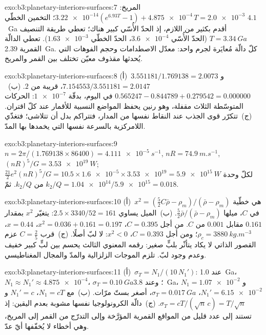 \begin{solution}{exo:b3:planetary-interiors-surfaces:7}
المريخ: $\num{3.22e-14}(e^{6.93T} - 1) + \num{4.875e-4}\,T = \num{2.0e-3}$؛
التخمين الخطّي $4.1$~Ga أقدم بكثير من اللازم، إذ الحدّ الأُسّي كبير
هناك؛ تعطي طريقة التنصيف $T = \qty{3.34}{Ga}$ (الحدّ الأُسّي
$\num{3.6e-4}$، الحدّ الخطّي $\num{1.63e-3}$). تعطي الدالّة القمرية
\qty{2.39}{Ga}. كلّ دالّة مُعايَرة لجرم واحد: معدّل
الاصطدامات وحجم الفوهات التي يُحدثها مقذوف معيّن تختلف
بين القمر والمريخ.
\end{solution}

\begin{solution}{exo:b3:planetary-interiors-surfaces:8}
(أ)~$3.551181/1.769138 = 2.0073$ و$7.154553/3.551181 = 2.0147$، قريبة من
$2$. (ب)~$0.565247 - 0.844789 + 0.279542 = 0.000000$ في اليوم، بدقّة
$\num{1e-7}$: الحركات المتوسّطة الثلاث مقفلة، وهو رنين يحفظ
المواضع النسبية للأقمار عند كلّ اقتران. (ج)~تتكرّر قوى الجذب عند
النقاط نفسها من المدار، فتتراكم بدل أن تتلاشى؛
فتغذّي اللامركزية بالسرعة نفسها التي يخمدها بها المدّ.
\end{solution}

\begin{solution}{exo:b3:planetary-interiors-surfaces:9}
$n = 2\pi/(1.769138\times86400) = \qty{4.111e-5}{s^{-1}}$, $nR =
\qty{74.9}{m.s^{-1}}$, $(nR)^5/G = \qty{3.53e19}{W}$;
$\tfrac{21}{2}e^2(nR)^5/G = 10.5\times\num{1.6e-5}\times\num{3.53e19} =
\qty{5.9e15}{W}$ لكلّ وحدة من $k_2/Q$. ثمّ $k_2/Q =
\num{1.04e14}/\num{5.9e15} = 0.018$.
\end{solution}

\begin{solution}{exo:b3:planetary-interiors-surfaces:10}
(أ)~$x^2 = (\tfrac52C\bar\rho - \rho_m)/(\bar\rho - \rho_m)$ هي خطّية في
$C$، ميلها $\tfrac52\bar\rho/(\bar\rho - \rho_m)$. (ب)~الميل يساوي
$2.5\times3340/52 = 161$: يتغيّر $x^2$ بمقدار $0.161$ مقابل $0.001$ من $C$.
من أجل $C = 0.395$، $x^2 = 0.036 + 0.161 = 0.197$، $x = 0.44$، $\rho_c =
\qty{3880}{kg.m^{-3}}$؛ ومن أجل $C = 0.393$، $x^2 < 0$: لا لبّ أصلًا.
(ج)~قرب $C = \tfrac25$ عزم القصور الذاتي لا يكاد يتأثّر بلبٍّ صغير:
رقمه المعنوي الثالث يحسم بين لبٍّ كبير خفيف وعدم وجود لبّ.
تلزم الموجات الزلزالية والمدّ والمجال المغناطيسي.
\end{solution}

\begin{solution}{exo:b3:planetary-interiors-surfaces:11}
(أ)~$\sigma_T = N_1/(10\,N_1')$: عند \qty{1.0}{Ga}، $N_1 \approx N_1' \approx
\num{4.875e-4}$، $\sigma_T = \qty{0.10}{Ga}$؛ وعند \qty{3.8}{Ga}، $N_1 =
\num{1.07e-2}$ و$N_1' = \num{6.15e-2}$، $\sigma_T = \qty{0.017}{Ga}$،
أصغر بستّ مرّات. (ب)~مع $N_1 = cT$، $N_1' = c$ و$\sigma_T =
cT/(\sqrt n\,c) = T/\sqrt n$. (ج)~دالّة الكرونولوجيا نفسها مشوبة
بعدم اليقين: إذ تستند إلى عدد قليل من المواقع القمرية المؤرَّخة وإلى التدرّج من القمر
إلى المريخ، وهي أخطاء لا يُخفّفها أيّ عدّ.
\end{solution}

